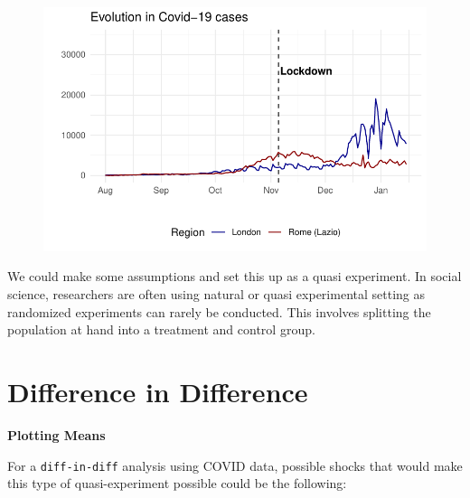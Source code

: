 \documentclass[
  letterpaper,
  DIV=11,
  numbers=noendperiod]{scrreprt}
\begin{document}
\begin{figure}[H]

{\centering \includegraphics{longitudinal-2_files/figure-pdf/unnamed-chunk-9-1.pdf}

}

\end{figure}

We could make some assumptions and set this up as a quasi experiment. In
social science, researchers are often using natural or quasi
experimental setting as randomized experiments can rarely be conducted.
This involves splitting the population at hand into a treatment and
control group.

\hypertarget{difference-in-difference}{%
\section{Difference in Difference}\label{difference-in-difference}}

\textbf{Plotting Means}

For a \texttt{diff-in-diff} analysis using COVID data, possible shocks
that would make this type of quasi-experiment possible could be the
following:
\end{document}
